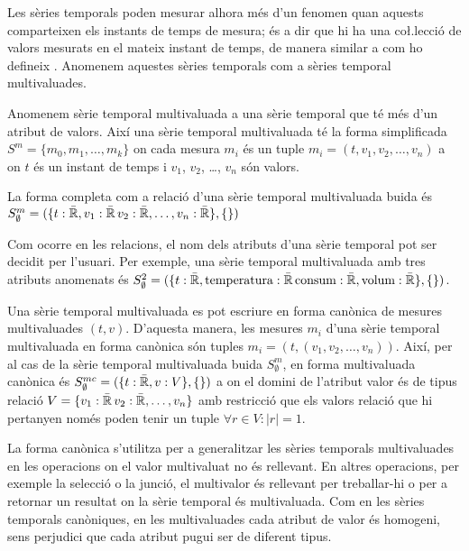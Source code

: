 Les sèries temporals poden mesurar alhora més d'un fenomen quan
aquests comparteixen els instants de temps de mesura; és a dir que hi
ha una co\l.lecció de valors mesurats en el mateix instant de temps,
de manera similar a com ho defineix \textcite{assfalg08:thesis}.
Anomenem aquestes sèries temporals com a sèries temporal
multivaluades.
\begin{definition}
  Anomenem sèrie temporal multivaluada a una sèrie temporal que té més
  d'un atribut de valors. Així una sèrie temporal multivaluada té la
  forma simplificada $S^m = \{ m_0, m_1 , \dotsc, m_k \}$ on cada mesura
  $m_i$ és un tuple $m_i=(t,v_1,v_2,\dotsc,v_n)$ a on $t$ és un
  instant de temps i $v_1$, $v_2$, \dots, $v_n$ són valors.

  La forma completa com a relació d'una sèrie temporal multivaluada
  buida és $S^m_{\emptyset} = ( \{t: \bar{\mathbb{R}{}}, v_1: \bar{\mathbb{R}{}}\, v_2:
  \bar{\mathbb{R}{}}, \dotsc, v_n: \bar{\mathbb{R}{}}\}, \{ \} )$
\end{definition}

Com ocorre en les relacions, el nom dels atributs d'una sèrie temporal
pot ser decidit per l'usuari. Per exemple, una sèrie temporal
multivaluada amb tres atributs anomenats és $S^2_{\emptyset} = ( \{t:
\bar{\mathbb{R}{}}, \text{temperatura}: \bar{\mathbb{R}{}}\, \text{consum}:
\bar{\mathbb{R}{}}, \text{volum}: \bar{\mathbb{R}{}}\}, \{ \} )$.



Una sèrie temporal multivaluada es pot escriure en forma canònica de
mesures multivaluades $(t,v)$. D'aquesta manera, les mesures $m_i$
d'una sèrie temporal multivaluada en forma canònica són tuples
$m_i=(t,(v_1,v_2,\dotsc,v_n))$.  Així, per al cas de la sèrie temporal
multivaluada buida $S^m_{\emptyset}$, en forma multivaluada canònica és
$S^{mc}_{\emptyset} = ( \{t: \bar{\mathbb{R}{}}, v: V \}, \{ \} )$ a on el
domini de l'atribut valor és de tipus relació $V = \{ v_1:
\bar{\mathbb{R}{}}\, v_2: \bar{\mathbb{R}{}}, \dotsc, v_n \}$ amb restricció que els
valors relació que hi pertanyen només poden tenir un tuple $\forall r
\in V: |r| = 1$.


La forma canònica s'utilitza per a
generalitzar les sèries temporals multivaluades en les operacions on
el valor multivaluat no és rellevant. En altres operacions, per
exemple la selecció o la junció, el multivalor és rellevant per
treballar-hi o per a retornar un resultat on la sèrie temporal és
multivaluada. Com en les sèries temporals canòniques, en les
multivaluades cada atribut de valor és homogeni, sens perjudici que
cada atribut pugui ser de diferent tipus.

